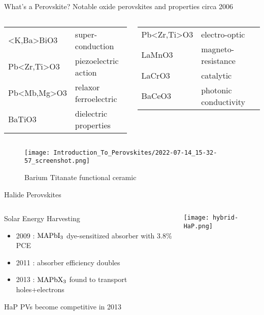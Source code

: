 \documentclass[10pt, aspectratio=169, presentation]{beamer}
\begin{document}
\begin{frame}[label={sec:orged427e8}]{What's a Perovskite?}
Notable oxide perovskites and properties circa 2006
\autocite{jiang-2006-predic-lattic}
\begin{columns}
\begin{column}{0.5\columnwidth}
\small
\begin{center}
\begin{tabular}{ll}
<K,Ba>BiO3 & super-conduction\\[0pt]
Pb<Zr,Ti>O3 & piezoelectric action\\[0pt]
Pb<Mb,Mg>O3 & relaxor ferroelectric\\[0pt]
BaTiO3 & dielectric properties\\[0pt]
\end{tabular}
\end{center}
\end{column}
\begin{column}{0.5\columnwidth}
\small
\begin{center}
\begin{tabular}{ll}
Pb<Zr,Ti>O3 & electro-optic\\[0pt]
LaMnO3 & magneto-resistance\\[0pt]
LaCrO3 & catalytic\\[0pt]
BaCeO3 & photonic conductivity\\[0pt]
\end{tabular}
\end{center}
\end{column}
\end{columns}
\begin{figure}[htbp]
\centering
\texttt{[image: Introduction\_To\_Perovskites/2022-07-14\_15-32-57\_screenshot.png]}
\caption{Barium Titanate functional ceramic}
\end{figure}
\end{frame}

\begin{frame}[label={sec:org122a40a}]{Halide Perovskites}
\begin{columns}
\begin{column}{0.5\columnwidth}
\begin{block}{Solar Energy Harvesting}
\begin{itemize}
\item 2009 : \(\ce{MAPbI_3}\) dye-sensitized absorber with 3.8\% PCE
\autocite{kojima-2009-organ-halid}
\item 2011 : absorber efficiency doubles
\autocite{im-2011}
\item 2013 : \(\ce{MAPbX_3}\) found to transport holes+electrons
\autocite{saliba-2014-influen-therm}
\end{itemize}

HaP PVs become competitive in 2013
\end{block}
\end{column}
\begin{column}{0.5\columnwidth}
\begin{center}
\texttt{[image: hybrid-HaP.png]}
\end{center}
\end{column}
\end{columns}
\end{frame}
\end{document}
